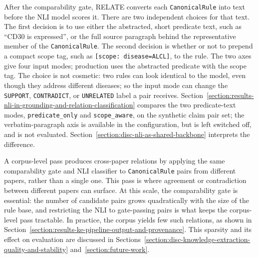 After the comparability gate, RELATE converts each \texttt{CanonicalRule} into text before the NLI model scores it. There are two independent choices for that text. The first decision is to use either the abstracted, short predicate text, such as ``CD30 is expressed'', or the full source paragraph behind the representative member of the \texttt{CanonicalRule}. The second decision is whether or not to prepend a compact scope tag, such as \texttt{[scope:~disease=ALCL]}, to the rule. The two axes give four input modes; production uses the abstracted predicate with the scope tag. The choice is not cosmetic: two rules can look identical to the model, even though they address different diseases; so the input mode can change the \texttt{SUPPORT}, \texttt{CONTRADICT}, or \texttt{UNRELATED} label a pair receives. Section~\ref{section:results-nli-in-grounding-and-relation-classification} compares the two predicate-text modes, \texttt{predicate\_only} and \texttt{scope\_aware}, on the synthetic claim pair set; the verbatim-paragraph axis is available in the configuration, but is left switched off, and is not evaluated. Section~\ref{section:disc-nli-as-shared-backbone} interprets the difference.

A corpus-level pass produces cross-paper relations by applying the same comparability gate and NLI classifier to \texttt{CanonicalRule} pairs from different papers, rather than a single one. This pass is where agreement or contradiction between different papers can surface. At this scale, the comparability gate is essential: the number of candidate pairs grows quadratically with the size of the rule base, and restricting the NLI to gate-passing pairs is what keeps the corpus-level pass tractable. In practice, the corpus yields few such relations, as shown in Section~\ref{section:results-ke-pipeline-output-and-provenance}. This sparsity and its effect on evaluation are discussed in Sections~\ref{section:disc-knowledge-extraction-quality-and-stability} and~\ref{section:future-work}.